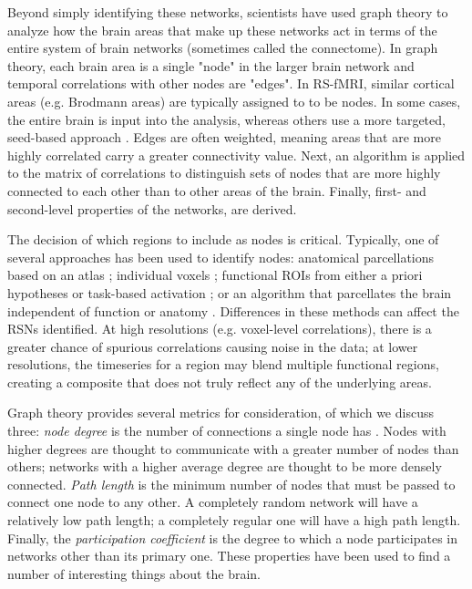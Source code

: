 Beyond simply identifying these networks, scientists have used graph theory to analyze how the brain areas that make up these networks act in terms of the entire system of brain networks (sometimes called the connectome). In graph theory, each brain area is a single "node" in the larger brain network and temporal correlations with other nodes are "edges". In RS-fMRI, similar cortical areas (e.g. Brodmann areas) are typically assigned to to be nodes. In some cases, the entire brain is input into the analysis, whereas others use a more targeted, seed-based approach \cite{Vogel2010}.  Edges are often weighted, meaning areas that are more highly correlated carry a greater connectivity value. Next, an algorithm is applied to the matrix of correlations to distinguish sets of nodes that are more highly connected to each other than to other areas of the brain. Finally, first- and second-level properties of the networks, are derived.

The decision of which regions to include as nodes is critical. Typically, one of several approaches has been used to identify nodes: anatomical parcellations based on an atlas \cite{Supekar2008, Liu2008, Lynall2010}; individual voxels \cite{Fair2007}; functional ROIs from either a priori hypotheses or task-based activation \cite{VandenHeuvel2010}; or an algorithm that parcellates the brain independent of function or anatomy \cite{Goni2014}.  Differences in these methods can affect the RSNs identified. At high resolutions (e.g. voxel-level correlations), there is a greater chance of spurious correlations causing noise in the data; at lower resolutions, the timeseries for a region may blend multiple functional regions, creating a composite that does not truly reflect any of the underlying areas. 

Graph theory provides several metrics for consideration, of which we discuss three: \textit{node degree} is the number of connections a single node has \cite{Sporns2013}. Nodes with higher degrees are thought to communicate with a greater number of nodes than others; networks with a higher average degree are thought to be more densely connected. \textit{Path length} is the minimum number of nodes that must be passed to connect one node to any other. A completely random network will have a relatively low path length; a completely regular one will have a high path length. Finally, the \textit{participation coefficient} is the degree to which a node participates in networks other than its primary one. These properties have been used to find a number of interesting things about the brain. 

